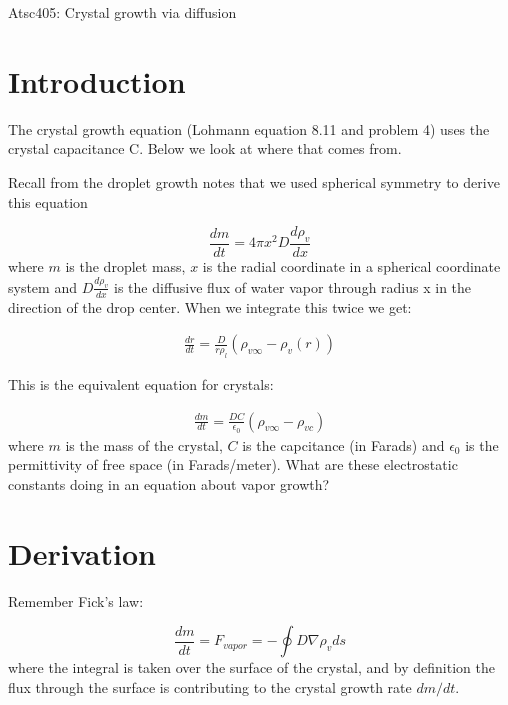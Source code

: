 \documentclass[12pt]{article}
\begin{document}
\newcommand{\vect}[1]{\boldsymbol{\vec{#1}}}
\pagestyle{first}

\begin{center}
Atsc405: Crystal growth via diffusion\\
\end{center}


\section{Introduction}
\label{sec:introduction}

The crystal growth equation (Lohmann equation 8.11 and problem 4) uses the crystal capacitance C.
Below we look at where that comes from.

Recall from the droplet growth notes that we used
spherical symmetry to derive this  equation

\begin{equation}
  \label{eq:diff}
  \frac{ dm}{dt} = 4 \pi x^2 D \frac{ d\rho_v}{dx} 
\end{equation}
where $m$ is the droplet mass, $x$ is the radial coordinate
in a spherical coordinate system and $D \frac{ d\rho_v}{dx} $ is the
diffusive flux of water vapor through radius x in the direction
of the drop center.  When we integrate this twice we get:

\begin{gather}
  \label{final}
  \frac{dr}{dt} = \frac{ D}{r\rho_l}  (\rho_{v \infty} - \rho_{v}(r) )
\end{gather}



This is the equivalent  equation for crystals:


\begin{gather}
  \label{finalC}
  \frac{dm}{dt} = \frac{ D C}{\epsilon_0}  \left ( \rho_{v \infty} - \rho_{vc}  \right )
\end{gather}
where $m$ is the mass of the crystal, $C$ is the capcitance (in Farads) and 
$\epsilon_0$ is the permittivity of free space (in Farads/meter).
What are these electrostatic constants doing in an equation about vapor growth?


\section{Derivation}
\label{sec:mass-continuity}

Remember Fick's law:


\begin{equation}
  \label{eq:vaporflux}
\frac{ dm}{dt} = F_{vapor} = - \oint D \nabla   \rho_v ds
\end{equation}
where the integral is taken over the surface of the crystal, and by definition
the flux through the surface is contributing to the crystal growth
rate $dm/dt$.
\end{document}
